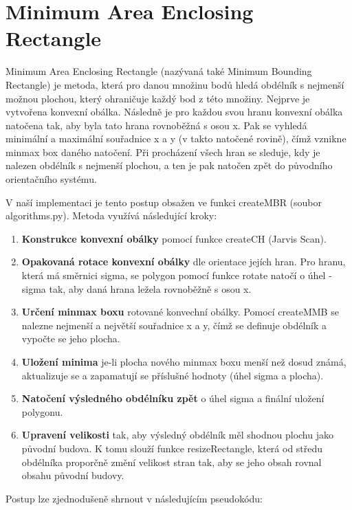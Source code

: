 \documentclass[a4paper,12pt]{article}
\begin{document}
\section{Minimum Area Enclosing Rectangle}
Minimum Area Enclosing Rectangle (nazývaná také Minimum Bounding Rectangle) je metoda, která pro danou množinu bodů hledá obdélník s nejmenší možnou plochou, který ohraničuje každý bod z této množiny.
Nejprve je vytvořena konvexní obálka. Následně je pro každou svou hranu konvexní obálka natočena tak, aby byla tato hrana rovnoběžná s osou x. Pak se vyhledá minimální a maximální souřadnice x a y (v takto natočené rovině), čímž vznikne minmax box daného natočení. Při procházení všech hran se sleduje, kdy je nalezen obdélník s nejmenší plochou, a ten je pak natočen zpět do původního orientačního systému. 

V naší implementaci je tento postup obsažen ve funkci createMBR (soubor algorithms.py). Metoda využívá následující kroky:

\begin{enumerate}
    \item \textbf{Konstrukce konvexní obálky} pomocí funkce createCH (Jarvis Scan).
    \item \textbf{Opakovaná rotace konvexní obálky} dle orientace jejích hran. Pro hranu, která má směrnici sigma, se polygon pomocí funkce rotate natočí o úhel -sigma tak, aby daná hrana ležela rovnoběžně s osou x.
    \item \textbf{Určení minmax boxu} rotované konvechní obálky. Pomocí createMMB se nalezne nejmenší a největší souřadnice x a y, čímž se definuje obdélník a vypočte se jeho plocha.
    \item \textbf{Uložení minima} je-li plocha nového minmax boxu menší než dosud známá, aktualizuje se a zapamatují se příslušné hodnoty (úhel sigma a plocha).
    \item \textbf{Natočení výsledného obdélníku zpět} o úhel sigma a finální uložení polygonu. 
    \item \textbf{Upravení velikosti} tak, aby výsledný obdélník měl shodnou plochu jako původní budova. K tomu slouží funkce resizeRectangle, která od středu obdélníka proporčně změní velikost stran tak, aby se jeho obsah rovnal obsahu původní budovy.
\end{enumerate}

Postup lze zjednodušeně shrnout v následujícím pseudokódu:
\end{document}
